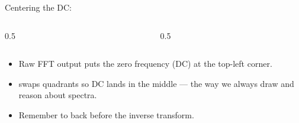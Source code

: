 \documentclass[10pt,aspectratio=169]{beamer}
\begin{document}
\begin{frame}{Centering the DC: }
  \begin{columns}[T]
    \begin{column}{0.5\textwidth}\begin{center}
    \end{center}\end{column}
    \begin{column}{0.5\textwidth}\begin{center}
    \end{center}\end{column}
  \end{columns}
  \vspace{4pt}
  \begin{itemize}
    \item Raw FFT output puts the zero frequency (DC) at the top-left corner.
    \item {} swaps quadrants so DC lands in the middle — the way we always draw and
          reason about spectra.
    \item Remember to  back before the inverse transform.
  \end{itemize}
\end{frame}
\end{document}
